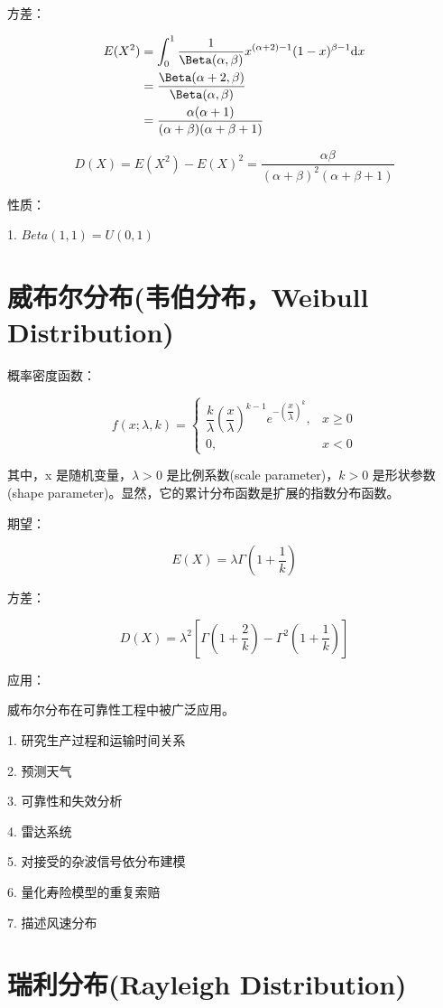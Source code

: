 \documentclass[12pt, a4paper, oneside]{ctexbook}
\begin{document}
方差：

\[
\begin{aligned}
E(X^{2}) &= \int_0^{1} \dfrac{1}{\Beta(\alpha, \beta)}x^{(\alpha + 2) - 1}(1 - x)^{\beta - 1} \mathrm{d}x \\
&= \dfrac{\Beta(\alpha + 2, \beta)}{\Beta(\alpha, \beta)} \\
&= \dfrac{\alpha(\alpha + 1)}{(\alpha + \beta)(\alpha + \beta + 1)}
\end{aligned}
\]

$$
D(X) = E(X^{2}) - E(X)^{2} = \dfrac{\alpha \beta}{(\alpha + \beta)^{2}(\alpha + \beta + 1)}
$$

 性质：

1. $Beta(1, 1) = U(0, 1)$

\section{威布尔分布(韦伯分布，Weibull Distribution)}

概率密度函数：

$$
f(x;\lambda, k) = \begin{cases}
\dfrac{k}{\lambda}(\dfrac{x}{\lambda})^{k - 1}e^{-(\dfrac{x}{\lambda})^k}, &x \geq 0 \\
0, &x < 0
\end{cases}
$$

其中，x 是随机变量，$\lambda > 0$ 是比例系数(scale parameter)，$k > 0$ 是形状参数(shape parameter)。显然，它的累计分布函数是扩展的指数分布函数。

 期望：

$$
E(X) = \lambda \Gamma(1 + \dfrac{1}{k})
$$

 方差：

$$
D(X) = \lambda^{2}\left[\Gamma(1 + \dfrac{2}{k}) - \Gamma^{2}(1 + \dfrac{1}{k})\right]
$$

 应用：

威布尔分布在可靠性工程中被广泛应用。

1. 研究生产过程和运输时间关系

2. 预测天气

3. 可靠性和失效分析

4. 雷达系统

5. 对接受的杂波信号依分布建模

6. 量化寿险模型的重复索赔

7. 描述风速分布

\section{瑞利分布(Rayleigh Distribution)}
\end{document}
